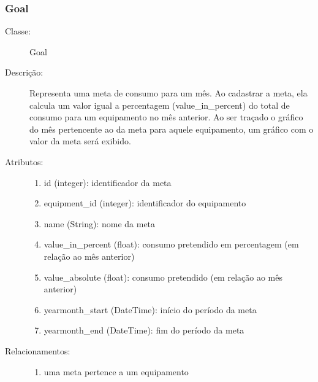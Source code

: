 \subsubsection{Goal}
\begin{description}
  \item[Classe:] Goal
  \item[Descrição:] Representa uma meta de consumo para um mês. Ao cadastrar a meta, ela calcula um valor igual a percentagem (value\_in\_percent) do total de consumo para um equipamento no mês anterior. Ao ser traçado o gráfico do mês pertencente ao da meta para aquele equipamento, um gráfico com o valor da meta será exibido.
  \item[Atributos:] \hfill
    \begin{enumerate}
      \item id (integer): identificador da meta
      \item equipment\_id (integer): identificador do equipamento
      \item name (String):  nome da meta
      \item value\_in\_percent (float): consumo pretendido em percentagem (em relação ao mês anterior)
      \item value\_absolute (float): consumo pretendido (em relação ao mês anterior)
      \item yearmonth\_start (DateTime): início do período da meta
        \item yearmonth\_end (DateTime): fim do período da meta
    \end{enumerate}
  \item[Relacionamentos:] \hfill
    \begin{enumerate}
      \item uma meta pertence a um equipamento
    \end{enumerate}
\end{description} 
%
